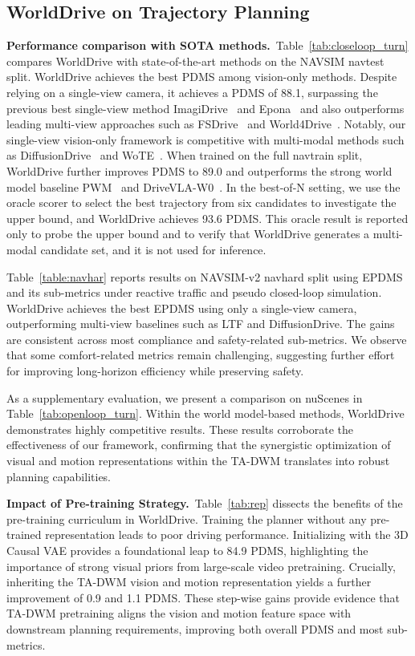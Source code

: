 \subsection{WorldDrive on Trajectory Planning}
\noindent\textbf{Performance comparison with SOTA methods.}~Table~\ref{tab:closeloop_turn} compares WorldDrive with state-of-the-art methods on the NAVSIM navtest split. WorldDrive achieves the best PDMS among vision-only methods. Despite relying on a single-view camera, it achieves a PDMS of 88.1, surpassing the previous best single-view method ImagiDrive~\cite{li2025imagidrive} and Epona~\cite{epona} and also outperforms leading multi-view approaches such as FSDrive~\cite{zeng2025fsdrive} and World4Drive~\cite{world4drive}. Notably, our single-view vision-only framework is competitive with multi-modal methods such as DiffusionDrive~\cite{diffusiondrive} and WoTE~\cite{li2025wote}.
When trained on the full navtrain split, WorldDrive further improves PDMS to 89.0 and outperforms the strong world model baseline PWM~\cite{zhao2025pwm} and DriveVLA-W0~\cite{drivevlaw0}. In the best-of-N setting, we use the oracle scorer to select the best trajectory from six candidates to investigate the upper bound, and WorldDrive achieves 93.6 PDMS. This oracle result is reported only to probe the upper bound and to verify that WorldDrive generates a multi-modal candidate set, and it is not used for inference.

Table~\ref{table:navhar} reports results on NAVSIM-v2 navhard split using EPDMS and its sub-metrics under reactive traffic and pseudo closed-loop simulation. WorldDrive achieves the best EPDMS using only a single-view camera, outperforming multi-view baselines such as LTF and DiffusionDrive. The gains are consistent across most compliance and safety-related sub-metrics. We observe that some comfort-related metrics remain challenging, suggesting further effort for improving long-horizon efficiency while preserving safety.

As a supplementary evaluation, we present a comparison on nuScenes in Table~\ref{tab:openloop_turn}. Within the world model-based methods, WorldDrive demonstrates highly competitive results. These results corroborate the effectiveness of our framework, confirming that the synergistic optimization of visual and motion representations within the TA-DWM translates into robust planning capabilities.

\noindent\textbf{Impact of Pre-training Strategy.}~Table~\ref{tab:rep} dissects the benefits of the pre-training curriculum in WorldDrive. Training the planner without any pre-trained representation leads to poor driving performance. Initializing with the 3D Causal VAE provides a foundational leap to 84.9 PDMS, highlighting the importance of strong visual priors from large-scale video pretraining. Crucially, inheriting the TA-DWM vision and motion representation yields a further improvement of 0.9 and 1.1 PDMS. These step-wise gains provide evidence that TA-DWM pretraining aligns the vision and motion feature space with downstream planning requirements, improving both overall PDMS and most sub-metrics.

